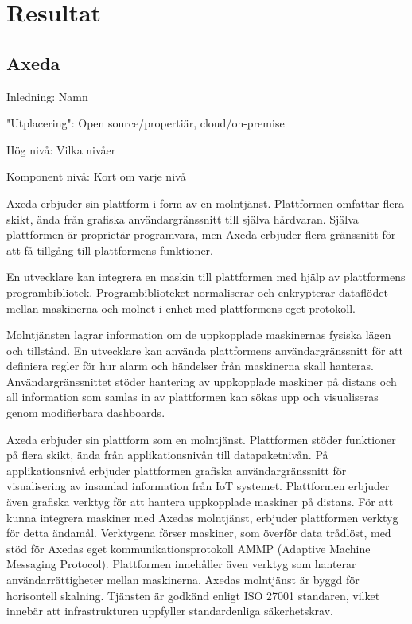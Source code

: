 


\section{Resultat}
\label{sec:esimluku}

\subsection{Axeda}
Inledning:
Namn 

"Utplacering":
Open source/propertiär, cloud/on-premise

Hög nivå:
Vilka nivåer

Komponent nivå:
Kort om varje nivå

Axeda erbjuder sin plattform i form av en molntjänst. Plattformen omfattar
flera skikt, ända från grafiska användargränssnitt till själva hårdvaran.
Själva plattformen är proprietär programvara, men Axeda erbjuder flera 
gränssnitt för att få tillgång till plattformens funktioner.

En utvecklare kan integrera en maskin till plattformen med hjälp av plattformens
programbibliotek. Programbiblioteket normaliserar och enkrypterar
dataflödet mellan maskinerna och molnet i enhet med plattformens eget
protokoll.

Molntjänsten lagrar information om de uppkopplade maskinernas fysiska lägen och
tillstånd. En utvecklare kan använda plattformens användargränssnitt för att
definiera regler för hur alarm och händelser från maskinerna skall hanteras.
Användargränssnittet stöder hantering av uppkopplade maskiner på distans och
all information som samlas in av plattformen kan sökas upp och visualiseras
genom modifierbara dashboards.




Axeda erbjuder sin plattform som en molntjänst. Plattformen stöder 
funktioner på flera skikt, ända från applikationsnivån till datapaketnivån.
På applikationsnivå erbjuder plattformen grafiska användargränssnitt för
visualisering av insamlad information från IoT systemet. Plattformen erbjuder
även grafiska verktyg för att hantera uppkopplade maskiner på distans.
För att kunna integrera maskiner med Axedas molntjänst, erbjuder plattformen 
verktyg för detta ändamål. Verktygena förser maskiner, som överför data 
trådlöst, med stöd för Axedas eget kommunikationsprotokoll AMMP 
(Adaptive Machine Messaging Protocol). Plattformen innehåller även verktyg
som hanterar användarrättigheter mellan maskinerna.
Axedas molntjänst är byggd för horisontell skalning. Tjänsten är godkänd
enligt ISO 27001 standaren, vilket innebär att infrastrukturen uppfyller
standardenliga säkerhetskrav. 

